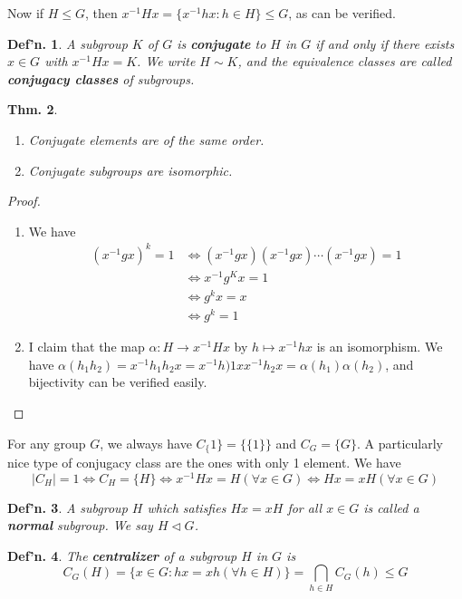 \documentclass[12pt, a4paper]{book}
\newtheorem{theorem}{Thm.}[section]
\newtheorem{definition}[theorem]{Def'n.}
\theoremstyle{nonumberplain}
\newtheorem{proof}{Proof}
\begin{document}
Now if $H\leq G$, then $x^{-1}Hx=\{x^{-1}hx:h\in H\}\leq G$, as can be verified.
\begin{definition}
    A subgroup $K$ of $G$ is \textbf{conjugate} to $H$ in $G$ if and only if there exists $x\in G$ with $x^{-1}Hx=K$.
    We write $H\sim K$, and the equivalence classes are called \textbf{conjugacy classes} of subgroups.
\end{definition}
\begin{theorem}
    \begin{enumerate}[nolistsep]
        \item Conjugate elements are of the same order.
        \item Conjugate subgroups are isomorphic.
    \end{enumerate}
\end{theorem}
\begin{proof}
    \begin{enumerate}
        \item We have
            \begin{align*}
                (x^{-1}gx)^k=1 &\Leftrightarrow (x^{-1}gx)(x^{-1}gx)\cdots(x^{-1}gx)=1\\
                               &\Leftrightarrow x^{-1}g^Kx=1\\
                               &\Leftrightarrow g^kx=x\\
                               &\Leftrightarrow g^k=1
            \end{align*}
        \item I claim that the map $\alpha:H\to x^{-1}Hx$ by $h\mapsto x^{-1}hx$ is an isomorphism.
            We have $\alpha(h_1h_2)=x^{-1}h_1h_2x=x^{-1}h)1xx^{-1}h_2x=\alpha(h_1)\alpha(h_2)$, and bijectivity can be verified easily.
    \end{enumerate}
\end{proof}
For any group $G$, we always have $C_\{1\}=\{\{1\}\}$ and $C_G=\{G\}$.
A particularly nice type of conjugacy class are the ones with only 1 element.
We have
\[|C_H|=1\Leftrightarrow C_H=\{H\}\Leftrightarrow x^{-1}Hx=H(\forall x\in G)\Leftrightarrow Hx=xH(\forall x\in G)\]
\begin{definition}
    A subgroup $H$ which satisfies $Hx=xH$ for all $x\in G$ is called a \textbf{normal} subgroup.
    We say $H\triangleleft G$.
\end{definition}
\begin{definition}
    The \textbf{centralizer} of a subgroup $H$ in $G$ is
    \[C_G(H)=\{x\in G:hx=xh(\forall h\in H)\}=\bigcap\limits_{h\in H}C_G(h)\leq G\]
\end{definition}
\end{document}
